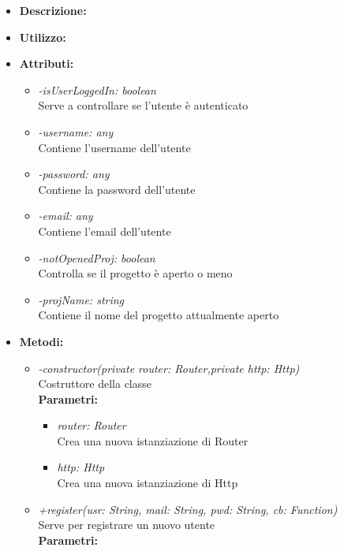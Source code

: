 \begin{itemize}
	\item \textbf{Descrizione:}\\
	
	\item \textbf{Utilizzo:}\\
	
	\item \textbf{Attributi:}
		\begin{itemize}
			\item \emph{-isUserLoggedIn: boolean}\\
			Serve a controllare se l'utente è autenticato
			\item \emph{-username: any}\\
			Contiene l'username dell'utente
			\item \emph{-password: any}\\
			Contiene la password dell'utente
			\item \emph{-email: any}\\
			Contiene l'email dell'utente
			\item \emph{-notOpenedProj: boolean}\\
			Controlla se il progetto è aperto o meno
			\item \emph{-projName: string}\\
			Contiene il nome del progetto attualmente aperto
		\end{itemize}
	\item \textbf{Metodi:}
		\begin{itemize}
			\item \emph{-constructor(private router: Router,private http: Http)}\\
    		Costruttore della classe\\
    		\textbf{Parametri:}
    		\begin{itemize}
    			\item \emph{router: Router}\\
    			Crea una nuova istanziazione di Router
    			\item \emph{http: Http}\\
    			Crea una nuova istanziazione di Http
    		\end{itemize}
    		\item \emph{+register(usr: String, mail: String, pwd: String, cb: Function)}\\
    		Serve per registrare un nuovo utente\\
    		\textbf{Parametri:}
    		\begin{itemize}

\end{itemize}
\end{itemize}
\end{itemize}
